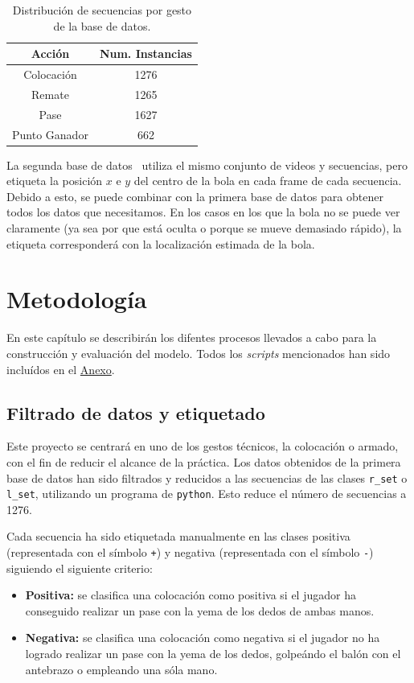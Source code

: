 \documentclass[12pt]{report} %
\begin{document}
    \begin{table}[H]
        \begin{tabular}{@{}cc@{}}
            \toprule
            Acción & Num. Instancias\\
            \midrule
            Colocación    & 1276\\
            Remate        & 1265\\
            Pase          & 1627\\
            Punto Ganador &  662\\
            \bottomrule
        \end{tabular}
        \caption{Distribución de secuencias por gesto de la base de datos.}
    \end{table}

    La segunda base de datos~\cite{dataset2} utiliza el mismo conjunto de videos y secuencias,
    pero etiqueta la posición $x$ e $y$ del centro de la bola en cada frame de
    cada secuencia. Debido a esto, se puede combinar con la primera base de
    datos para obtener todos los datos que necesitamos. En los casos en los que
    la bola no se puede ver claramente (ya sea por que está oculta o porque se
    mueve demasiado rápido), la etiqueta corresponderá con la localización
    estimada de la bola.

    \chapter{Metodología}
    \label{chap:metodologia}
    En este capítulo se describirán los difentes procesos llevados a cabo para la construcción y evaluación del modelo. Todos los \textit{scripts} mencionados han sido incluídos en el \hyperref[anexo]{Anexo}.

    \section{Filtrado de datos y etiquetado}

    Este proyecto se centrará en uno de los gestos técnicos, la colocación o
    armado, con el fin de reducir el alcance de la práctica. Los datos obtenidos
    de la primera base de datos han sido filtrados y reducidos a las secuencias
    de las clases \verb!r_set! o \verb!l_set!, utilizando un programa de
    \verb!python!. Esto reduce el número de
    secuencias a 1276.

    Cada secuencia ha sido etiquetada manualmente en las clases positiva
    (representada con el símbolo \verb!+!) y negativa (representada con el
    símbolo \verb!-!) siguiendo el siguiente criterio:
    \begin{itemize}
        \item \textbf{Positiva:} se clasifica una colocación como positiva si
        el jugador ha conseguido realizar un pase con la yema de los dedos de
        ambas manos.
        \item \textbf{Negativa:} se clasifica una colocación como negativa si
        el jugador no ha logrado realizar un pase con la yema de los dedos,
        golpeándo el balón con el antebrazo o empleando una sóla mano.
    \end{itemize}
    
\end{document}
